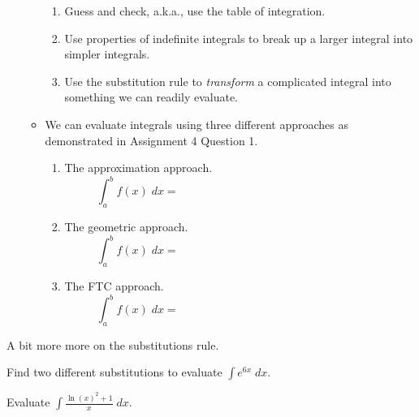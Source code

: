 \documentclass[../main.tex]{subfiles}
\begin{document}
\begin{enumerate}[wide, label=\textbf{Part~\arabic*}.]
\begin{itemize}
        \begin{enumerate}[wide]
          \item Guess and check, a.k.a., use the table of integration. 


          \item Use properties of indefinite integrals to break up a larger integral into simpler integrals. 
          \item Use the substitution rule to \emph{transform} a complicated integral into something we can readily evaluate.
        \end{enumerate}

      \item We can evaluate integrals using three different approaches as demonstrated in Assignment 4 Question 1.

        \begin{enumerate}[wide]
          \item The approximation approach. 
            \[
              \int_{a}^{b} f(x) \;dx = \hspace{3in}
            \]


          \item The geometric approach. 
            \[
              \int_{a}^{b} f(x) \;dx = \hspace{3in}
            \]


          \item The FTC approach. 
            \[
              \int_{a}^{b} f(x) \;dx = \hspace{3in}
            \]

        \end{enumerate}
    \end{itemize}
\end{enumerate}

\clearpage
A bit more more on the substitutions rule. 

\begin{example}
  Find two different substitutions to evaluate \(\int e^{6x} \;dx\).

\end{example}

\begin{example}
  Evaluate \(\int \frac{\ln(x)^{2} + 1}{x} \;dx\).

\end{example}
\end{document}

